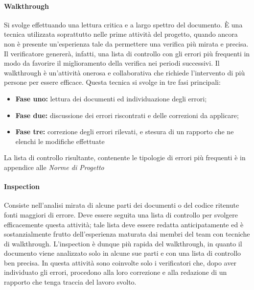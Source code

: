     \paragraph{Walkthrough}
    Si svolge effettuando una lettura critica e a largo spettro del documento.
È una tecnica utilizzata soprattutto nelle prime attività del progetto, quando ancora
non è presente un'esperienza tale da permettere una verifica più mirata e precisa.
Il verificatore genererà, infatti, una lista di controllo con gli errori più frequenti
in modo da favorire il miglioramento della verifica nei periodi successivi.
Il walkthrough è un'attività onerosa e collaborativa che richiede l'intervento di
più persone per essere efficace. Questa tecnica si svolge in tre fasi principali:
\begin{itemize}
\item \textbf{Fase uno:} lettura dei documenti ed individuazione degli errori;
\item \textbf{Fase due:} discussione dei errori riscontrati e delle correzioni da applicare;
\item \textbf{Fase tre:} correzione degli errori rilevati, e stesura di un rapporto che ne elenchi le modifiche effettuate
\end{itemize}

La lista di controllo risultante, contenente le tipologie di errori più frequenti è in appendice alle
\emph{Norme di Progetto \VersioneNP{}}

    \paragraph{Inspection}
	Consiste nell'analisi mirata di alcune parti dei documenti o del codice ritenute fonti maggiori di errore. Deve essere seguita una lista di controllo per svolgere efficacemente questa attività; tale lista deve essere redatta anticipatamente ed è sostanzialmente frutto dell'esperienza maturata dai membri del team con tecniche di walkthrough.
L'inspection è dunque più rapida del walkthrough, in quanto il documento viene
analizzato solo in alcune sue parti e con una lista di controllo ben precisa. In questa
attività sono coinvolte solo i verificatori che, dopo aver individuato gli errori, procedono
alla loro correzione e alla redazione di un rapporto che tenga traccia del lavoro svolto.

